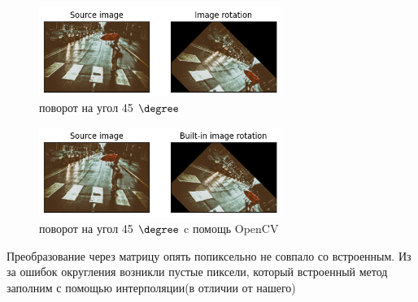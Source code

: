 \documentclass[a4paper,12pt]{article}
\begin{document}
\begin{figure}[H]
    \centering \includegraphics[width=0.7\textwidth]{my_images/21.png}
    \caption{поворот на угол 45 $\degree$}
\end{figure}
\begin{figure}[H]
    \centering \includegraphics[width=0.7\textwidth]{my_images/22.png}
    \caption{поворот на угол 45 $\degree$ c помощь OpenCV}
\end{figure}
Преобразование через матрицу опять попиксельно не совпало со встроенным. Из за ошибок округления возникли пустые пиксели, который встроенный метод заполним с помощью интерполяции(в отличии от нашего)
\end{document}
